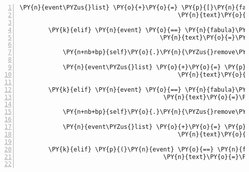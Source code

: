 \begin{Verbatim}[commandchars=\\\{\},numbers=left,firstnumber=1,stepnumber=1]
            \PY{n}{event\PYZus{}list} \PY{o}{+}\PY{o}{=} \PY{p}{[}\PY{n}{fabula}\PY{o}{.}\PY{n}{SaysEvent}\PY{p}{(}\PY{n}{identifier}\PY{o}{=}\PY{n}{ID\PYZus{}CASSANDRA}\PY{p}{,}
                                            \PY{n}{text}\PY{o}{=}\PY{l+s}{\PYZsq{}}\PY{l+s}{Vielleicht liegt der Schlüssel hier rum?}\PY{l+s}{\PYZsq{}}\PY{p}{)}\PY{p}{]}

        \PY{k}{elif} \PY{n}{event} \PY{o}{==} \PY{n}{fabula}\PY{o}{.}\PY{n}{SaysEvent}\PY{p}{(}\PY{n}{identifier}\PY{o}{=}\PY{n}{ID\PYZus{}KUNI}\PY{p}{,}
                                       \PY{n}{text}\PY{o}{=}\PY{l+s}{\PYZsq{}}\PY{l+s}{Ich hab den Eingang zum Gnomenweg gefunden! Aber er ist verschlossen.}\PY{l+s}{\PYZsq{}}\PY{p}{)}\PY{p}{:}

            \PY{n+nb+bp}{self}\PY{o}{.}\PY{n}{\PYZus{}remove\PYZus{}sentence}\PY{p}{(}\PY{n}{ID\PYZus{}KUNI}\PY{p}{,} \PY{n}{event}\PY{o}{.}\PY{n}{text}\PY{p}{)}

            \PY{n}{event\PYZus{}list} \PY{o}{+}\PY{o}{=} \PY{p}{[}\PY{n}{fabula}\PY{o}{.}\PY{n}{SaysEvent}\PY{p}{(}\PY{n}{identifier}\PY{o}{=}\PY{n}{ID\PYZus{}CASSANDRA}\PY{p}{,}
                                            \PY{n}{text}\PY{o}{=}\PY{l+s}{\PYZsq{}}\PY{l+s}{Vielleicht liegt der Schlüssel hier irgendwo rum?}\PY{l+s}{\PYZsq{}}\PY{p}{)}\PY{p}{]}

        \PY{k}{elif} \PY{n}{event} \PY{o}{==} \PY{n}{fabula}\PY{o}{.}\PY{n}{SaysEvent}\PY{p}{(}\PY{n}{identifier}\PY{o}{=}\PY{n}{ID\PYZus{}KUNI}\PY{p}{,}
                                        \PY{n}{text}\PY{o}{=}\PY{l+s}{\PYZsq{}}\PY{l+s}{Auf dem Schild an der Brücke steht Überfliegen erlaubt!}\PY{l+s}{\PYZsq{}}\PY{p}{)}\PY{p}{:}

            \PY{n+nb+bp}{self}\PY{o}{.}\PY{n}{\PYZus{}remove\PYZus{}sentence}\PY{p}{(}\PY{n}{ID\PYZus{}KUNI}\PY{p}{,} \PY{n}{event}\PY{o}{.}\PY{n}{text}\PY{p}{)}

            \PY{n}{event\PYZus{}list} \PY{o}{+}\PY{o}{=} \PY{p}{[}\PY{n}{fabula}\PY{o}{.}\PY{n}{SaysEvent}\PY{p}{(}\PY{n}{identifier}\PY{o}{=}\PY{n}{ID\PYZus{}CASSANDRA}\PY{p}{,}
                                            \PY{n}{text}\PY{o}{=}\PY{l+s}{\PYZsq{}}\PY{l+s}{Mit reparierten Flügeln kann ich da also rüber fliegen}\PY{l+s}{\PYZsq{}}\PY{p}{)}\PY{p}{]}

        \PY{k}{elif} \PY{p}{(}\PY{n}{event} \PY{o}{==} \PY{n}{fabula}\PY{o}{.}\PY{n}{SaysEvent}\PY{p}{(}\PY{n}{identifier}\PY{o}{=}\PY{n}{ID\PYZus{}KUNI}\PY{p}{,}
                                        \PY{n}{text}\PY{o}{=}\PY{l+s}{\PYZsq{}}\PY{l+s}{Ich habe einen sehr klebrigen Spinnweb dabei.}\PY{l+s}{\PYZsq{}}\PY{p}{)}\PY{p}{)}\PY{p}{:}


\end{Verbatim}
